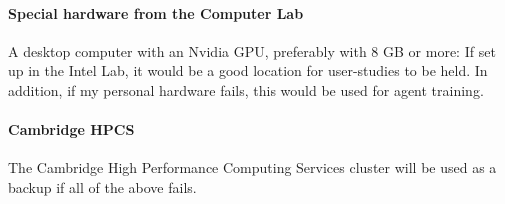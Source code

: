 \documentclass[a4paper]{article}
\begin{document}
\paragraph{Special hardware from the Computer Lab} A desktop computer with an Nvidia GPU, preferably with 8 GB or more: If set up in the Intel Lab, it would be a good location for user-studies to be held. In addition, if my personal hardware fails, this would be used for agent training.

\paragraph{Cambridge HPCS} The Cambridge High Performance Computing Services cluster will be used as a backup if all of the above fails.


 

\end{document}
